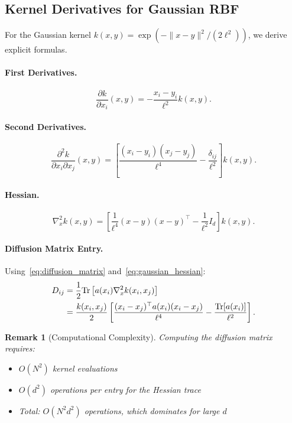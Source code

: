\documentclass[11pt,a4paper]{article}
\newtheorem{remark}[theorem]{Remark}
\newcommand{\Tr}{\mathrm{Tr}}
\begin{document}
\subsection{Kernel Derivatives for Gaussian RBF}

For the Gaussian kernel $k(x,y) = \exp(-\|x-y\|^2/(2\ell^2))$, we derive explicit formulas.

\paragraph{First Derivatives.}
\begin{equation}
\frac{\partial k}{\partial x_i}(x,y) = -\frac{x_i - y_i}{\ell^2} k(x,y).
\end{equation}

\paragraph{Second Derivatives.}
\begin{equation}
\frac{\partial^2 k}{\partial x_i \partial x_j}(x,y) = \left[\frac{(x_i - y_i)(x_j - y_j)}{\ell^4} - \frac{\delta_{ij}}{\ell^2}\right] k(x,y).
\end{equation}

\paragraph{Hessian.}
\begin{equation}\label{eq:gaussian_hessian}
\nabla_x^2 k(x,y) = \left[\frac{1}{\ell^4}(x-y)(x-y)^\top - \frac{1}{\ell^2} I_d\right] k(x,y).
\end{equation}

\paragraph{Diffusion Matrix Entry.} Using~\eqref{eq:diffusion_matrix} and~\eqref{eq:gaussian_hessian}:
\begin{align}
D_{ij} &= \frac{1}{2} \Tr\left[a(x_i) \nabla_x^2 k(x_i, x_j)\right] \notag \\
&= \frac{k(x_i, x_j)}{2} \left[\frac{(x_i - x_j)^\top a(x_i) (x_i - x_j)}{\ell^4} - \frac{\Tr[a(x_i)]}{\ell^2}\right]. \label{eq:D_entry}
\end{align}

\begin{remark}[Computational Complexity]
Computing the diffusion matrix requires:
\begin{itemize}
\item $O(N^2)$ kernel evaluations
\item $O(d^2)$ operations per entry for the Hessian trace
\item Total: $O(N^2 d^2)$ operations, which dominates for large $d$
\end{itemize}
\end{remark}
\end{document}
